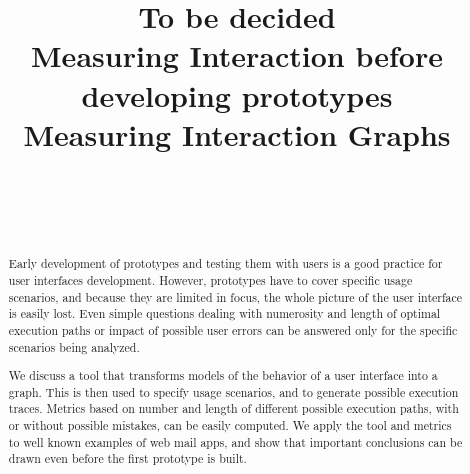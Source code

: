 \documentclass{sigchi}
\begin{document}
\title{To be decided\\
Measuring Interaction before developing prototypes\\
Measuring Interaction Graphs}

\author{%
  \\
  \\
  \\
}

\maketitle

\begin{abstract}
  Early development of prototypes and testing them with users is a good
  practice for user interfaces development. However, prototypes have
  to cover specific usage scenarios, and because they are limited
  in focus, the whole picture of the user interface is easily lost. Even
  simple questions dealing with numerosity and length of
  optimal execution paths or impact of possible user errors can be
  answered only for the specific scenarios being analyzed.

  We discuss a tool that transforms models of the behavior of a user
  interface into a graph. This is then used to specify usage
  scenarios, and to generate possible execution traces. Metrics based
  on number and length of different possible execution paths, with or
  without possible mistakes, can be easily computed. We apply the tool
  and metrics to well known examples of web mail apps, and show that
  important conclusions can be drawn even before the first prototype
  is built.
  
\end{abstract}

\end{document}
